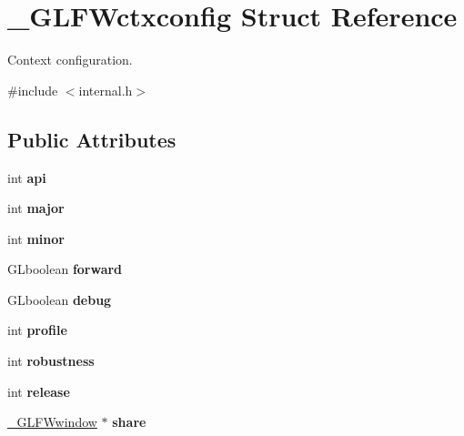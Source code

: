\hypertarget{struct__GLFWctxconfig}{}\section{\+\_\+\+G\+L\+F\+Wctxconfig Struct Reference}
\label{struct__GLFWctxconfig}


Context configuration.  




{\ttfamily \#include $<$internal.\+h$>$}

\subsection*{Public Attributes}
\begin{DoxyCompactItemize}
\item 
\hypertarget{struct__GLFWctxconfig_a7e4a62c41d875578e6603557f073fc60}{}int {\bfseries api}\label{struct__GLFWctxconfig_a7e4a62c41d875578e6603557f073fc60}

\item 
\hypertarget{struct__GLFWctxconfig_a51a8fa315dccf7f6217098cf0413a7a9}{}int {\bfseries major}\label{struct__GLFWctxconfig_a51a8fa315dccf7f6217098cf0413a7a9}

\item 
\hypertarget{struct__GLFWctxconfig_a250a475c8d778778bb8fb4ab942eddd9}{}int {\bfseries minor}\label{struct__GLFWctxconfig_a250a475c8d778778bb8fb4ab942eddd9}

\item 
\hypertarget{struct__GLFWctxconfig_a394ca59111c02ef3a614f62a95edd277}{}G\+Lboolean {\bfseries forward}\label{struct__GLFWctxconfig_a394ca59111c02ef3a614f62a95edd277}

\item 
\hypertarget{struct__GLFWctxconfig_aab1692eb03436029ae75c79c3519e7e7}{}G\+Lboolean {\bfseries debug}\label{struct__GLFWctxconfig_aab1692eb03436029ae75c79c3519e7e7}

\item 
\hypertarget{struct__GLFWctxconfig_a0c56aeafa0f85b1b0ba3e9371a737770}{}int {\bfseries profile}\label{struct__GLFWctxconfig_a0c56aeafa0f85b1b0ba3e9371a737770}

\item 
\hypertarget{struct__GLFWctxconfig_a5aaf92358c6be9ac0dac61cc916b968f}{}int {\bfseries robustness}\label{struct__GLFWctxconfig_a5aaf92358c6be9ac0dac61cc916b968f}

\item 
\hypertarget{struct__GLFWctxconfig_a70db828a89fe653b4efd5ec03419b46d}{}int {\bfseries release}\label{struct__GLFWctxconfig_a70db828a89fe653b4efd5ec03419b46d}

\item 
\hypertarget{struct__GLFWctxconfig_ae2de5454bfc052ffa9c27f300fcc0425}{}\hyperlink{struct__GLFWwindow}{\+\_\+\+G\+L\+F\+Wwindow} $\ast$ {\bfseries share}\label{struct__GLFWctxconfig_ae2de5454bfc052ffa9c27f300fcc0425}

\end{DoxyCompactItemize}


